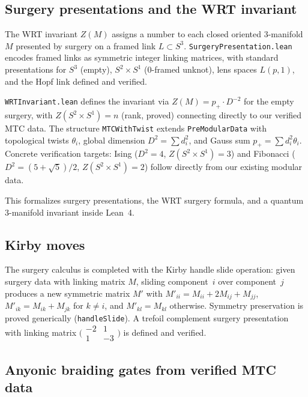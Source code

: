 \documentclass[12pt]{article}
\newcommand{\lean}[1]{\texttt{#1}}
\begin{document}
\subsection{Surgery presentations and the WRT invariant}

The WRT invariant $Z(M)$ assigns a number to each closed oriented
3-manifold $M$ presented by surgery on a framed link $L \subset S^3$.
\texttt{SurgeryPresentation.lean} encodes framed links as symmetric
integer linking matrices, with standard presentations for $S^3$ (empty),
$S^2 \times S^1$ (0-framed unknot), lens spaces $L(p,1)$, and the
Hopf link defined and verified.

\texttt{WRTInvariant.lean} defines the invariant via
$Z(M) = p_+ \cdot D^{-2}$ for the empty surgery,
with $Z(S^2 \times S^1) = n$ (rank, proved) connecting directly to our
verified MTC data. The structure \texttt{MTCWithTwist} extends
\texttt{PreModularData} with topological twists $\theta_i$, global
dimension $D^2 = \sum d_i^2$, and Gauss sum $p_+ = \sum d_i^2 \theta_i$.
Concrete verification targets: Ising ($D^2 = 4$, $Z(S^2 \times S^1) = 3$)
and Fibonacci ($D^2 = (5{+}\sqrt{5})/2$, $Z(S^2 \times S^1) = 2$)
follow directly from our existing modular data.

This formalizes surgery presentations, the WRT surgery formula, and a
quantum 3-manifold invariant inside Lean~4.

\subsection{Kirby moves}

The surgery calculus is completed with the Kirby handle slide operation:
given surgery data with linking matrix $M$, sliding component~$i$ over
component~$j$ produces a new symmetric matrix $M'$ with
$M'_{ii} = M_{ii} + 2M_{ij} + M_{jj}$, $M'_{ik} = M_{ik} + M_{jk}$
for $k \neq i$, and $M'_{kl} = M_{kl}$ otherwise.  Symmetry
preservation is proved generically (\lean{handleSlide}).  A trefoil
complement surgery presentation with linking matrix
$\bigl(\begin{smallmatrix} -2 & 1 \\ 1 & -3 \end{smallmatrix}\bigr)$
is defined and verified.

\subsection{Anyonic braiding gates from verified MTC data}
\label{sec:braiding-gates}
\end{document}
